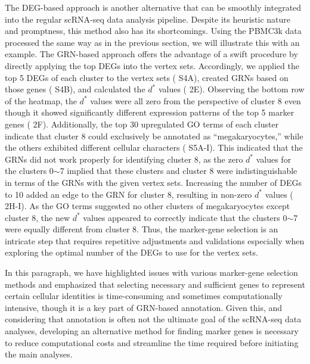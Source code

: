 \documentclass{article}
\begin{document}
The DEG-based approach is another alternative that can be smoothly integrated into the regular scRNA-seq 
data analysis pipeline. Despite its heuristic nature and promptness, this method also has its shortcomings. Using 
the PBMC3k data processed the same way as in the previous section, we will illustrate this with an example. The 
GRN-based approach offers the advantage of a swift procedure by directly applying the top DEGs into the vertex 
sets. Accordingly, we applied the top 5 DEGs of each cluster to the vertex sets (\figurename{ S4A}), created GRNs based 
on those genes (\figurename{ S4B}), and calculated the $d^*$ values (\figurename{ 2E}). Observing the bottom row of the heatmap, 
the $d^*$ values were all zero from the perspective of cluster 8 even though it showed significantly different expression 
patterns of the top 5 marker genes (\figurename{ 2F}). Additionally, the top 30 upregulated GO terms of each cluster 
indicate that cluster 8 could exclusively be annotated as ``megakaryocytes,'' while the others exhibited different 
cellular characters (\figurename{ S5A-I}). This indicated that the GRNs did not work properly for identifying cluster 8, 
as the zero $d^*$ values for the clusters 0$\sim$7 implied that these clusters and cluster 8 were indistinguishable in terms 
of the GRNs with the given vertex sets. Increasing the number of DEGs to 10 added an edge to the GRN for 
cluster 8, resulting in non-zero $d^*$ values (\figurename{ 2H-I}). As the GO terms suggested no other clusters of megakaryocytes 
except cluster 8, the new $d^*$ values appeared to correctly indicate that the clusters 0$\sim$7 were equally different from 
cluster 8. Thus, the marker-gene selection is an intricate step that requires repetitive adjustments and validations 
especially when exploring the optimal number of the DEGs to use for the vertex sets.

In this paragraph, we have highlighted issues with various marker-gene selection methods and emphasized that 
selecting necessary and sufficient genes to represent certain cellular identities is time-consuming and sometimes 
computationally intensive, though it is a key part of GRN-based annotation. Given this, and considering that 
annotation is often not the ultimate goal of the scRNA-seq data analyses, developing an alternative method for 
finding marker genes is necessary to reduce computational costs and streamline the time required before initiating 
the main analyses.
\end{document}
